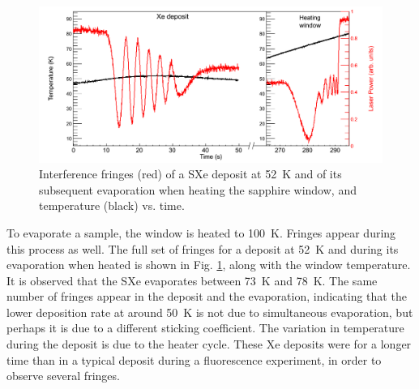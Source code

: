 
\begin{figure} %
        \centering
                \includegraphics[width=.9\textwidth]{figures/fringes_dep_and_melt.png}
                \caption{Interference fringes (red) of a SXe deposit at 52~K and of its subsequent evaporation when heating the sapphire window, and temperature (black) vs. time.}
\label{fig:fringes_melt_withDep}
\end{figure}

To evaporate a sample, the window is heated to 100~K.  Fringes appear during this process as well.  The full set of fringes for a deposit at 52~K and during its evaporation when heated is shown in Fig. \ref{fig:fringes_melt_withDep}, along with the window temperature.  It is observed that the SXe evaporates between 73~K and 78~K.  The same number of fringes appear in the deposit and the evaporation, indicating that the lower deposition rate at around 50~K is not due to simultaneous evaporation, but perhaps it is due to a different sticking coefficient.  The variation in temperature during the deposit is due to the heater cycle.  These Xe deposits were for a longer time than in a typical deposit during a fluorescence experiment, in order to observe several fringes.



